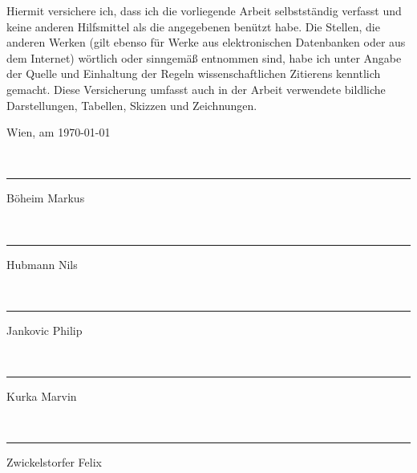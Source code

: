 
Hiermit versichere ich, dass ich die vorliegende Arbeit selbstständig verfasst und keine anderen Hilfsmittel als die angegebenen benützt habe. Die Stellen, die anderen Werken (gilt ebenso für Werke aus elektronischen Datenbanken oder aus dem Internet) wörtlich oder sinngemäß entnommen sind, habe ich unter Angabe der Quelle und Einhaltung der Regeln wissenschaftlichen Zitierens kenntlich gemacht. Diese Versicherung umfasst auch in der Arbeit verwendete bildliche Darstellungen, Tabellen, Skizzen und Zeichnungen.

\begin{flushleft}
\bigskip{}
Wien, am \today \\
\newcommand{\namesigdate}[2][8cm]{
\vspace{2cm}~\newline
\parbox{#1}{\hrule\centering #2\Large\strut}
\hfill
}
\namesigdate{Böheim Markus}
\namesigdate{Hubmann Nils}
\namesigdate{Jankovic Philip}
\namesigdate{Kurka Marvin}
\namesigdate{Zwickelstorfer Felix}
\par\end{flushleft}

